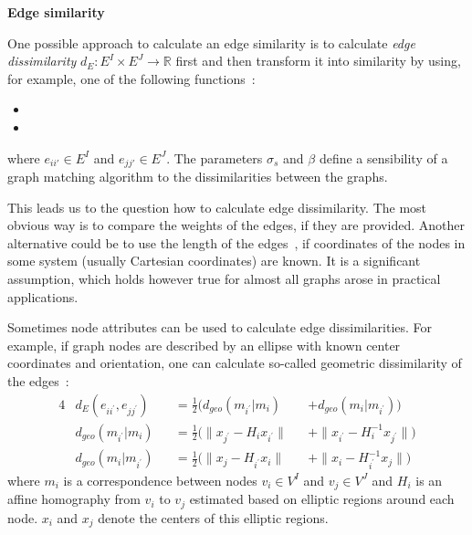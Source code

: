 \textbf{Edge similarity}

One possible approach to calculate an edge similarity is to calculate \emph{edge dissimilarity} $d_E:E^I\times E^J\rightarrow\mathbb{R}$ first and then transform it into similarity by using, for example, one of the following functions~\cite{ Cho2009_AgglClustering, Cho2010_RRWM,Cho2012_ProgressiveGM,Cho2014_Haystack}:
\begin{itemize}
	\item {}
	\item {}
\end{itemize}
where $e_{ii\prime}\in E^I$ and $e_{jj\prime}\in E^J$. The parameters $\sigma_s$ and $\beta$ define a sensibility of a graph matching algorithm to the dissimilarities between the graphs.

This leads us to the question how to calculate edge dissimilarity. The most obvious way is to compare the weights of the edges, if they are provided. Another alternative could be to use the length of the edges~\cite{Cho2009_AgglClustering, Cho2010_RRWM,Cho2012_ProgressiveGM,Cho2014_Haystack}, if coordinates of the nodes in some system (usually Cartesian coordinates) are known. It is a significant assumption, which holds however true for almost all graphs arose in practical applications.

Sometimes node attributes can be used to calculate edge dissimilarities. For example, if graph nodes are described by an ellipse with known center coordinates and orientation, one can calculate so-called geometric dissimilarity of the edges~\cite{Cho2009_AgglClustering,Cho2012_ProgressiveGM}:
\begin{alignat}{4}\label{eq:geomDiss}
& d_E(e_{ii^\prime},e_{jj^\prime}) && =\frac{1}{2}(d_{geo}(m_{i^\prime}|m_i) && +d_{geo}(m_i|m_{i^\prime})) \\
& d_{geo}(m_{i^\prime}|m_i) && =\frac{1}{2}(\|x_{j^\prime}-H_{i}x_{i^\prime}\| && + \|x_{i^\prime}-H^{-1}_ix_{j^\prime}\|) \\
& d_{geo}(m_i|m_{i^\prime}) && =\frac{1}{2}(\|x_j-H_{i^\prime}x_i\| && + \|x_{i}-H^{-1}_{i^\prime}x_j\|) 
\end{alignat}
where $m_i$ is a correspondence between nodes $v_i\in V^I$ and $v_{j}\in V^J$ and $H_i$ is an affine homography from $v_i$ to $v_{j}$ estimated based on elliptic regions around each node. $x_i$ and $x_{j}$ denote the centers of this elliptic regions.

